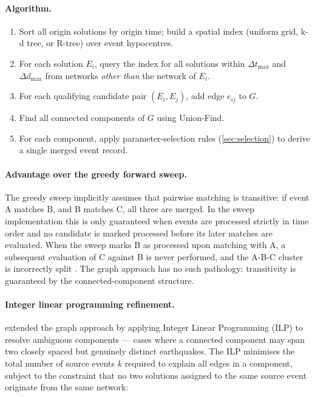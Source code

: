 \documentclass[12pt]{article}
\begin{document}
\paragraph{Algorithm.}
\begin{enumerate}
  \item Sort all origin solutions by origin time; build a spatial index (uniform
        grid, k-d tree, or R-tree) over event hypocentres.
  \item For each solution $E_i$, query the index for all solutions within
        $\Delta t_{\max}$ and $\Delta d_{\max}$ from networks \emph{other than}
        the network of $E_i$.
  \item For each qualifying candidate pair $(E_i, E_j)$, add edge $e_{ij}$ to
        $G$.
  \item Find all connected components of $G$ using Union-Find.
  \item For each component, apply parameter-selection rules
        (\cref{sec:selection}) to derive a single merged event record.
\end{enumerate}

\paragraph{Advantage over the greedy forward sweep.}
The greedy sweep implicitly assumes that pairwise matching is transitive: if
event A matches B, and B matches C, all three are merged.  In the sweep
implementation this is only guaranteed when events are processed strictly in
time order and no candidate is marked processed before its later matches are
evaluated.  When the sweep marks B as processed upon matching with A, a
subsequent evaluation of C against B is never performed, and the A-B-C cluster
is incorrectly split \citep{Patton2016}.  The graph approach has no such
pathology: transitivity is guaranteed by the connected-component structure.

\paragraph{Integer linear programming refinement.}
\citet{Patton2016} extended the graph approach by applying Integer Linear
Programming (ILP) to resolve ambiguous components — cases where a connected
component may span two closely spaced but genuinely distinct earthquakes.  The
ILP minimises the total number of source events $k$ required to explain all
edges in a component, subject to the constraint that no two solutions assigned to
the same source event originate from the same network:
\end{document}
